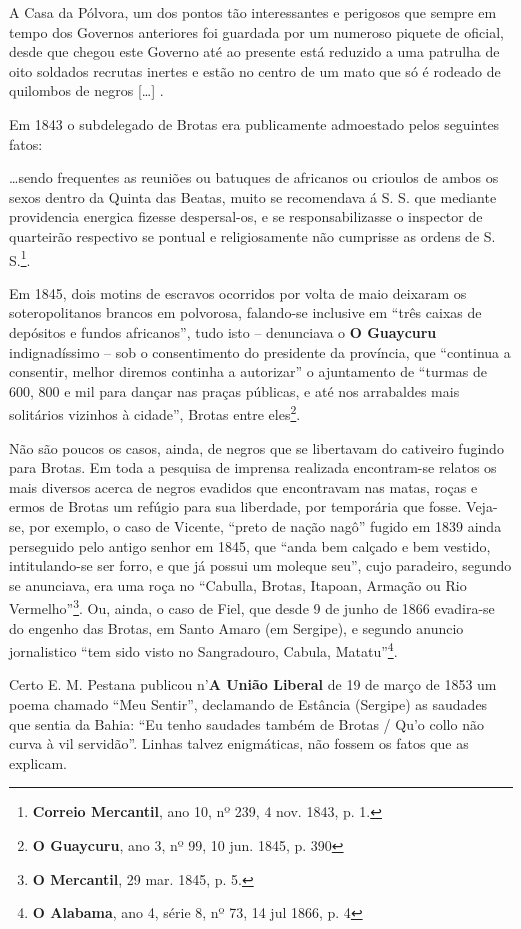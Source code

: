 \begin{citacao}
A Casa da Pólvora, um dos pontos tão interessantes e perigosos que sempre em tempo dos Governos anteriores foi guardada por um numeroso piquete de oficial, desde que chegou este Governo até ao presente está reduzido a uma patrulha de oito soldados recrutas inertes e estão no centro de um mato que só é rodeado de quilombos de negros [\dots] \cite[pp.~103-106]{ott_formaet2_1957}.
\end{citacao}

Em 1843 o subdelegado de Brotas era publicamente admoestado pelos seguintes fatos:

\begin{citacao}
\dots sendo frequentes as reuniões ou batuques de africanos ou crioulos de ambos os sexos dentro da Quinta das Beatas, muito se recomendava á S. S. que mediante providencia energica fizesse despersal-os, e se responsabilizasse o inspector de quarteirão respectivo se pontual e religiosamente não cumprisse as ordens de S. S.\footnote{\textbf{Correio Mercantil}, ano 10, nº 239, 4 nov. 1843, p. 1.}.
\end{citacao}

Em 1845, dois motins de escravos ocorridos por volta de maio deixaram os soteropolitanos brancos em polvorosa, falando-se inclusive em ``três caixas de depósitos e fundos africanos'', tudo isto -- denunciava o \textbf{O Guaycuru} indignadíssimo -- sob o consentimento do presidente da província, que ``continua a consentir, melhor diremos continha a autorizar'' o ajuntamento de ``turmas de  600, 800 e mil para dançar nas praças públicas, e até nos arrabaldes mais solitários vizinhos à cidade'', Brotas entre eles\footnote{\textbf{O Guaycuru}, ano 3, nº 99, 10 jun. 1845, p. 390}.

Não são poucos os casos, ainda, de negros que se libertavam do cativeiro fugindo para Brotas. Em toda a pesquisa de imprensa realizada encontram-se relatos os mais diversos acerca de negros evadidos que encontravam nas matas, roças e ermos de Brotas um refúgio para sua liberdade, por temporária que fosse. Veja-se, por exemplo, o caso de Vicente, ``preto de nação nagô'' fugido em 1839 ainda perseguido pelo antigo senhor em 1845, que ``anda bem calçado e bem vestido, intitulando-se ser forro, e que já possui um moleque seu'', cujo paradeiro, segundo se anunciava, era uma roça no ``Cabulla, Brotas, Itapoan, Armação ou Rio Vermelho''\footnote{\textbf{O Mercantil}, 29 mar. 1845, p. 5.}. Ou, ainda, o caso de Fiel, que desde 9 de junho de 1866 evadira-se do engenho das Brotas, em Santo Amaro (em Sergipe), e segundo anuncio jornalistico ``tem sido visto no Sangradouro, Cabula, Matatu''\footnote{\textbf{O Alabama}, ano 4, série 8, nº 73, 14 jul 1866, p. 4}.

Certo E. M. Pestana publicou n'\textbf{A União Liberal} de 19 de março de 1853 um poema chamado ``Meu Sentir'', declamando de Estância (Sergipe) as saudades que sentia da Bahia: ``Eu tenho saudades também de Brotas / Qu'o collo não curva à vil servidão''. Linhas talvez enigmáticas, não fossem os fatos que as explicam.